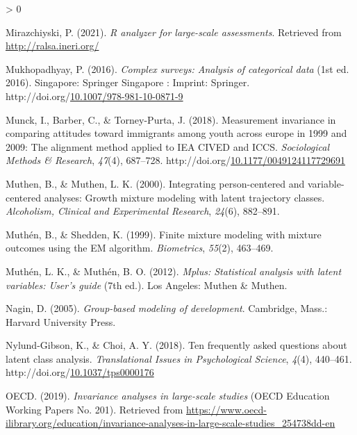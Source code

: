 \documentclass[12pt,a4paper,oneside]{reedthesis}
\newlength{\cslhangindent}
\newenvironment{CSLReferences}[2] %
 {%
  \setlength{\parindent}{0pt}
  \ifodd #1 \everypar{\setlength{\hangindent}{\cslhangindent}}\ignorespaces\fi
  \ifnum #2 > 0
  \setlength{\parskip}{#2\baselineskip}
  \fi
 }%
 {}
\begin{document}
\begin{CSLReferences}{1}{0}
\leavevmode\hypertarget{ref-mirazchiyski_r_2021}{}%
Mirazchiyski, P. (2021). \emph{R analyzer for large-scale assessments}. Retrieved from \url{http://ralsa.ineri.org/}

\leavevmode\hypertarget{ref-mukhopadhyay_complex_2016}{}%
Mukhopadhyay, P. (2016). \emph{Complex surveys: Analysis of categorical data} (1st ed. 2016). Singapore: Springer Singapore : Imprint: Springer. http://doi.org/\href{https://doi.org/10.1007/978-981-10-0871-9}{10.1007/978-981-10-0871-9}

\leavevmode\hypertarget{ref-munck_measurement_2018}{}%
Munck, I., Barber, C., \& Torney-Purta, J. (2018). Measurement invariance in comparing attitudes toward immigrants among youth across europe in 1999 and 2009: The alignment method applied to {IEA} {CIVED} and {ICCS}. \emph{Sociological Methods \& Research}, \emph{47}(4), 687--728. http://doi.org/\href{https://doi.org/10.1177/0049124117729691}{10.1177/0049124117729691}

\leavevmode\hypertarget{ref-muthen_integrating_2000}{}%
Muthen, B., \& Muthen, L. K. (2000). Integrating person-centered and variable-centered analyses: Growth mixture modeling with latent trajectory classes. \emph{Alcoholism, Clinical and Experimental Research}, \emph{24}(6), 882--891.

\leavevmode\hypertarget{ref-muthen_finite_1999}{}%
Muthén, B., \& Shedden, K. (1999). Finite mixture modeling with mixture outcomes using the {EM} algorithm. \emph{Biometrics}, \emph{55}(2), 463--469.

\leavevmode\hypertarget{ref-muthen_mplus_2012}{}%
Muthén, L. K., \& Muthén, B. O. (2012). \emph{Mplus: Statistical analysis with latent variables: User's guide} (7th ed.). Los Angeles: Muthen \& Muthen.

\leavevmode\hypertarget{ref-nagin_group-based_2005}{}%
Nagin, D. (2005). \emph{Group-based modeling of development}. Cambridge, Mass.: Harvard University Press.

\leavevmode\hypertarget{ref-nylund-gibson_ten_2018}{}%
Nylund-Gibson, K., \& Choi, A. Y. (2018). Ten frequently asked questions about latent class analysis. \emph{Translational Issues in Psychological Science}, \emph{4}(4), 440--461. http://doi.org/\href{https://doi.org/10.1037/tps0000176}{10.1037/tps0000176}

\leavevmode\hypertarget{ref-oecd_invariance_2019}{}%
OECD. (2019). \emph{Invariance analyses in large-scale studies} (OECD Education Working Papers No. 201). Retrieved from \url{https://www.oecd-ilibrary.org/education/invariance-analyses-in-large-scale-studies_254738dd-en}


\end{CSLReferences}
\end{document}
